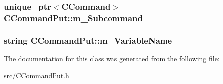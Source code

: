 \subsubsection[{\texorpdfstring{m\+\_\+\+Subcommand}{m_Subcommand}}]{\setlength{\rightskip}{0pt plus 5cm}unique\+\_\+ptr$<${\bf C\+Command}$>$ C\+Command\+Put\+::m\+\_\+\+Subcommand\hspace{0.3cm}{\ttfamily [private]}}\hypertarget{classCCommandPut_abf1c7a0d0d5c112640b529ba90637d74}{}\label{classCCommandPut_abf1c7a0d0d5c112640b529ba90637d74}
\subsubsection[{\texorpdfstring{m\+\_\+\+Variable\+Name}{m_VariableName}}]{\setlength{\rightskip}{0pt plus 5cm}string C\+Command\+Put\+::m\+\_\+\+Variable\+Name\hspace{0.3cm}{\ttfamily [private]}}\hypertarget{classCCommandPut_a583f3fd126a5fc69456c4538e1783f00}{}\label{classCCommandPut_a583f3fd126a5fc69456c4538e1783f00}


The documentation for this class was generated from the following file\+:\begin{DoxyCompactItemize}
\item 
src/\hyperlink{CCommandPut_8h}{C\+Command\+Put.\+h}\end{DoxyCompactItemize}
